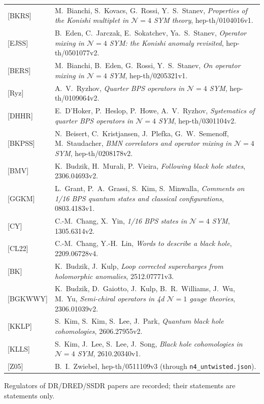 \documentclass[11pt]{article}
\theoremstyle{definition}
\begin{document}
\begin{longtable}{p{2.0cm}p{14.0cm}}
{[BKRS]} & M.~Bianchi, S.~Kovacs, G.~Rossi, Y.~S.~Stanev, \emph{Properties of the Konishi multiplet in $\mathcal N=4$ SYM theory}, hep-th/0104016v1.\\
{[EJSS]} & B.~Eden, C.~Jarczak, E.~Sokatchev, Ya.~S.~Stanev, \emph{Operator mixing in $\mathcal N=4$ SYM: the Konishi anomaly revisited}, hep-th/0501077v2.\\
{[BERS]} & M.~Bianchi, B.~Eden, G.~Rossi, Y.~S.~Stanev, \emph{On operator mixing in $\mathcal N=4$ SYM}, hep-th/0205321v1.\\
{[Ryz]} & A.~V.~Ryzhov, \emph{Quarter BPS operators in $\mathcal N=4$ SYM}, hep-th/0109064v2.\\
{[DHHR]} & E.~D'Hoker, P.~Heslop, P.~Howe, A.~V.~Ryzhov, \emph{Systematics of quarter BPS operators in $\mathcal N=4$ SYM}, hep-th/0301104v2.\\
{[BKPSS]} & N.~Beisert, C.~Kristjansen, J.~Plefka, G.~W.~Semenoff, M.~Staudacher, \emph{BMN correlators and operator mixing in $\mathcal N=4$ SYM}, hep-th/0208178v2.\\
{[BMV]} & K.~Budzik, H.~Murali, P.~Vieira, \emph{Following black hole states}, 2306.04693v2.\\
{[GGKM]} & L.~Grant, P.~A.~Grassi, S.~Kim, S.~Minwalla, \emph{Comments on 1/16 BPS quantum states and classical configurations}, 0803.4183v1.\\
{[CY]} & C.-M.~Chang, X.~Yin, \emph{1/16 BPS states in $\mathcal N=4$ SYM}, 1305.6314v2.\\
{[CL22]} & C.-M.~Chang, Y.-H.~Lin, \emph{Words to describe a black hole}, 2209.06728v4.\\
{[BK]} & K.~Budzik, J.~Kulp, \emph{Loop corrected supercharges from holomorphic anomalies}, 2512.07771v3.\\
{[BGKWWY]} & K.~Budzik, D.~Gaiotto, J.~Kulp, B.~R.~Williams, J.~Wu, M.~Yu, \emph{Semi-chiral operators in 4d $\mathcal N=1$ gauge theories}, 2306.01039v2.\\
{[KKLP]} & S.~Kim, S.~Kim, S.~Lee, J.~Park, \emph{Quantum black hole cohomologies}, 2606.27955v2.\\
{[KLLS]} & S.~Kim, J.~Lee, S.~Lee, J.~Song, \emph{Black hole cohomologies in $\mathcal N=4$ SYM}, 2610.20340v1.\\
{[Z05]} & B.~I.~Zwiebel, hep-th/0511109v3 (through \texttt{n4\_untwisted.json}).\\
\end{longtable}
Regulators of DR/DRED/SSDR papers are recorded; their statements are statements only.
\end{document}

